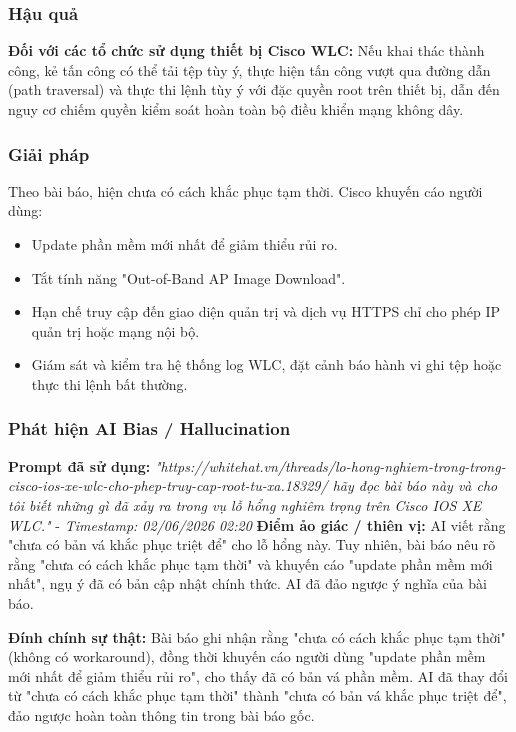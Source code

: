 \subsubsection{Hậu quả}
\textbf{Đối với các tổ chức sử dụng thiết bị Cisco WLC:} Nếu khai thác thành công, kẻ tấn công có thể tải tệp tùy ý, thực hiện tấn công vượt qua đường dẫn (path traversal) và thực thi lệnh tùy ý với đặc quyền root trên thiết bị, dẫn đến nguy cơ chiếm quyền kiểm soát hoàn toàn bộ điều khiển mạng không dây.

\subsubsection{Giải pháp}
Theo bài báo, hiện chưa có cách khắc phục tạm thời. Cisco khuyến cáo người dùng:

\begin{itemize}
    \item Update phần mềm mới nhất để giảm thiểu rủi ro.
    \item Tắt tính năng "Out-of-Band AP Image Download".
    \item Hạn chế truy cập đến giao diện quản trị và dịch vụ HTTPS chỉ cho phép IP quản trị hoặc mạng nội bộ.
    \item Giám sát và kiểm tra hệ thống log WLC, đặt cảnh báo hành vi ghi tệp hoặc thực thi lệnh bất thường.
\end{itemize}

\subsubsection{Phát hiện AI Bias / Hallucination}
\textbf{Prompt đã sử dụng:} \textit{"{https://whitehat.vn/threads/lo-hong-nghiem-trong-trong-cisco-ios-xe-wlc-cho-phep-truy-cap-root-tu-xa.18329/} hãy đọc bài báo này và cho tôi biết những gì đã xảy ra trong vụ lỗ hổng nghiêm trọng trên Cisco IOS XE WLC."} - \textit{Timestamp: 02/06/2026 02:20}
\textbf{Điểm ảo giác / thiên vị:}
AI viết rằng "chưa có bản vá khắc phục triệt để" cho lỗ hổng này. Tuy nhiên, bài báo nêu rõ rằng "chưa có cách khắc phục tạm thời" và khuyến cáo "update phần mềm mới nhất", ngụ ý đã có bản cập nhật chính thức. AI đã đảo ngược ý nghĩa của bài báo.

\textbf{Đính chính sự thật:}
Bài báo ghi nhận rằng "chưa có cách khắc phục tạm thời" (không có workaround), đồng thời khuyến cáo người dùng "update phần mềm mới nhất để giảm thiểu rủi ro", cho thấy đã có bản vá phần mềm. AI đã thay đổi từ "chưa có cách khắc phục tạm thời" thành "chưa có bản vá khắc phục triệt để", đảo ngược hoàn toàn thông tin trong bài báo gốc.

